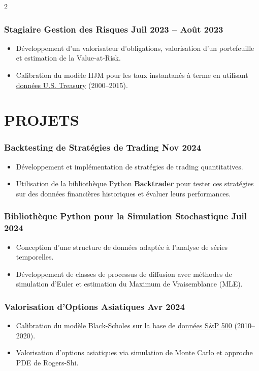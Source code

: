 \documentclass[11pt,asfal]{amdresume}
\begin{document}
\begin{paracol}{2}
\subsubsection{Stagiaire Gestion des Risques \dotfill Juil 2023 – Août 2023}
\begin{itemize}
\item Développement d’un valorisateur d’obligations, valorisation d’un portefeuille et estimation de la Value-at-Risk.
\item Calibration du modèle HJM pour les taux instantanés à terme en utilisant \href{https://www.federalreserve.gov/econres/feds/the-us-treasury-yield-curve-1961-to-the-present.htm}{données U.S. Treasury} (2000–2015).
\end{itemize}

\section{PROJETS}

\subsubsection{Backtesting de Stratégies de Trading \dotfill Nov 2024}
\begin{itemize}
    \item Développement et implémentation de stratégies de trading quantitatives.
    \item Utilisation de la bibliothèque Python \textbf{Backtrader} pour tester ces stratégies sur des données financières historiques et évaluer leurs performances.
\end{itemize}

\subsubsection{Bibliothèque Python pour la Simulation Stochastique  \dotfill Juil 2024}
\begin{itemize}
    \item Conception d’une structure de données adaptée à l’analyse de séries temporelles.
    \item Développement de classes de processus de diffusion avec méthodes de simulation d’Euler et estimation du Maximum de Vraisemblance (MLE).
\end{itemize}

\subsubsection{Valorisation d’Options Asiatiques \dotfill Avr 2024}
\begin{itemize}
    \item Calibration du modèle Black-Scholes sur la base de \href{https://finance.yahoo.com/quote/%5EGSPC/history/}{données S\&P 500} (2010–2020).
    \item Valorisation d’options asiatiques via simulation de Monte Carlo et approche PDE de Rogers-Shi.
\end{itemize}


\end{paracol}
\end{document}
